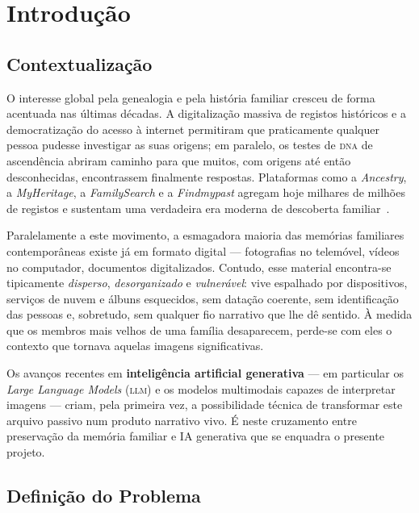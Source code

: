 \chapter{Introdução}
\label{cap:introducao}

\section{Contextualização}
\label{sec:contextualizacao}

O interesse global pela genealogia e pela história familiar cresceu de
forma acentuada nas últimas décadas. A digitalização massiva de registos
históricos e a democratização do acesso à internet permitiram que
praticamente qualquer pessoa pudesse investigar as suas origens; em
paralelo, os testes de \textsc{dna} de ascendência abriram caminho para
que muitos, com origens até então desconhecidas, encontrassem finalmente
respostas. Plataformas como a \emph{Ancestry}, a \emph{MyHeritage}, a
\emph{FamilySearch} e a \emph{Findmypast} agregam hoje milhares de milhões
de registos e sustentam uma verdadeira era moderna de descoberta
familiar~\cite{familytreemag}.

Paralelamente a este movimento, a esmagadora maioria das memórias
familiares contemporâneas existe já em formato digital — fotografias no
telemóvel, vídeos no computador, documentos digitalizados. Contudo, esse
material encontra-se tipicamente \emph{disperso}, \emph{desorganizado} e
\emph{vulnerável}: vive espalhado por dispositivos, serviços de nuvem e
álbuns esquecidos, sem datação coerente, sem identificação das pessoas e,
sobretudo, sem qualquer fio narrativo que lhe dê sentido. À medida que os
membros mais velhos de uma família desaparecem, perde-se com eles o
contexto que tornava aquelas imagens significativas.

Os avanços recentes em \textbf{inteligência artificial generativa} — em
particular os \emph{Large Language Models} (\textsc{llm}) e os modelos
multimodais capazes de interpretar imagens — criam, pela primeira vez, a
possibilidade técnica de transformar este arquivo passivo num produto
narrativo vivo. É neste cruzamento entre preservação da memória familiar
e IA generativa que se enquadra o presente projeto.

\section{Definição do Problema}
\label{sec:problema}

